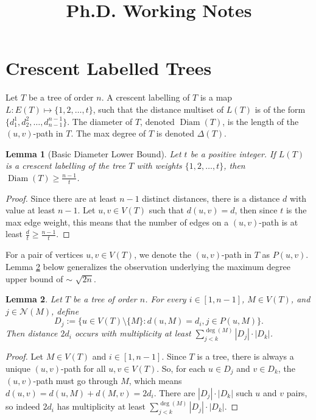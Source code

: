 \documentclass[12]{article}
\title{ \vspace{-3cm} Ph.D. Working Notes }
\DeclareMathOperator{\diam}{Diam}
\newtheorem{lem}{Lemma} %
\theoremstyle{definition}
\begin{document}
	\maketitle
	
	\section{Crescent Labelled Trees}
	
	Let $T$ be a tree of order $n$.  A crescent labelling of $T$ is a map $L: E(T) \mapsto \{1,2, \ldots, t\}$, such that the distance multiset of $L(T)$ is of the form $\{d_1^1,d_2^2, \ldots, d_{n-1}^{n-1}\}$.  The diameter of $T$, denoted $\diam(T)$, is the length of the $(u,v)$-path in $T$.  The max degree of $T$ is denoted $\Delta(T)$.  %
	

\begin{lem}[Basic Diameter Lower Bound]
	Let $t$ be a positive integer.  If $L(T)$ is a crescent labelling of the tree $T$ with weights $\{1,2,\ldots,t\}$, then $\diam(T) \geq \tfrac{n-1}{t}$.
\end{lem}

\begin{proof}
	Since there are at least $n-1$ distinct distances, there is a distance $d$ with value at least $n-1$.  Let $u,v \in V(T)$ such that $d(u,v) = d$, then since $t$ is the max edge weight, this means that the number of edges on a $(u,v)$-path is at least $\tfrac{d}{t} \geq \tfrac{n-1}{t}$.
\end{proof}
	
	
	For a pair of vertices $u,v \in V(T)$, we denote the $(u,v)$-path in $T$ as $P(u,v)$.  Lemma \ref{Lemma-DegreeClasses} below generalizes the observation underlying the maximum degree upper bound of $\sim$ $\sqrt{2n}$.
	
	\begin{lem}\label{Lemma-DegreeClasses}
		Let $T$ be a tree of order $n$.  For every $i \in [1,n-1]$, $M \in V(T)$, and $j \in \mathcal{N}(M)$, define
		$$D_j := \{u \in V(T) \setminus \{M\}: d(u,M) = d_i, j \in P(u,M)\}.$$
		Then distance $2d_i$ occurs with multiplicity at least $\sum_{j < k}^{\deg(M)} |D_j|\cdot |D_k|$.
	\end{lem}

	\begin{proof}
		Let $M \in V(T)$ and $i \in [1,n-1]$.  Since $T$ is a tree, there is always a unique $(u,v)$-path for all $u,v \in V(T)$.  So, for each $u \in D_j$ and $v \in D_k$, the $(u,v)$-path must go through $M$, which means $d(u,v) = d(u,M) + d(M,v) = 2d_i$.  There are $|D_j| \cdot |D_k|$ such $u$ and $v$ pairs, so indeed $2d_i$ has multiplicity at least $\sum_{j < k}^{\deg(M)} |D_j|\cdot |D_k|$. \qedhere
	\end{proof}
	
\end{document}

